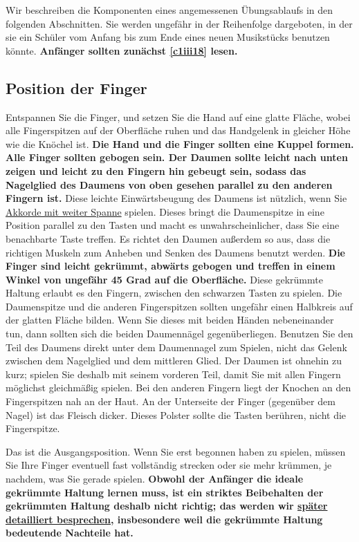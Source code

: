 Wir beschreiben die Komponenten eines angemessenen Übungsablaufs in den folgenden Abschnitten.
Sie werden ungefähr in der Reihenfolge dargeboten, in der sie ein Schüler vom Anfang bis zum Ende eines neuen Musikstücks benutzen könnte.
\textbf{Anfänger sollten zunächst \hyperref[c1iii18]{\autoref{c1iii18}} lesen.}


\subsection{Position der Finger}
\label{c1ii2}

Entspannen Sie die Finger, und setzen Sie die Hand auf eine glatte Fläche, wobei alle Fingerspitzen auf der Oberfläche ruhen und das Handgelenk in gleicher Höhe wie die Knöchel ist.
\textbf{Die Hand und die Finger sollten eine Kuppel formen.
Alle Finger sollten gebogen sein.
Der Daumen sollte leicht nach unten zeigen und leicht zu den Fingern hin gebeugt sein, sodass das Nagelglied des Daumens von oben gesehen parallel zu den anderen Fingern ist.}
Diese leichte Einwärtsbeugung des Daumens ist nützlich, wenn Sie \hyperref[c1iii7e]{Akkorde mit weiter Spanne} spielen.
Dieses bringt die Daumenspitze in eine Position parallel zu den Tasten und macht es unwahrscheinlicher, dass Sie eine benachbarte Taste treffen.
Es richtet den Daumen außerdem so aus, dass die richtigen Muskeln zum Anheben und Senken des Daumens benutzt werden.
\textbf{Die Finger sind leicht gekrümmt, abwärts gebogen und treffen in einem Winkel von ungefähr 45 Grad auf die Oberfläche.}
Diese gekrümmte Haltung erlaubt es den Fingern, zwischen den schwarzen Tasten zu spielen.
Die Daumenspitze und die anderen Fingerspitzen sollten ungefähr einen Halbkreis auf der glatten Fläche bilden.
Wenn Sie dieses mit beiden Händen nebeneinander tun, dann sollten sich die beiden Daumennägel gegenüberliegen.
Benutzen Sie den Teil des Daumens direkt unter dem Daumennagel zum Spielen, nicht das Gelenk zwischen dem Nagelglied und dem mittleren Glied.
Der Daumen ist ohnehin zu kurz; spielen Sie deshalb mit seinem vorderen Teil, damit Sie mit allen Fingern möglichst gleichmäßig spielen.
Bei den anderen Fingern liegt der Knochen an den Fingerspitzen nah an der Haut.
An der Unterseite der Finger (gegenüber dem Nagel) ist das Fleisch dicker.
Dieses Polster sollte die Tasten berühren, nicht die Fingerspitze.

Das ist die Ausgangsposition.
Wenn Sie erst begonnen haben zu spielen, müssen Sie Ihre Finger eventuell fast vollständig strecken oder sie mehr krümmen, je nachdem, was Sie gerade spielen.
\textbf{Obwohl der Anfänger die ideale gekrümmte Haltung lernen muss, ist ein striktes Beibehalten der gekrümmten Haltung deshalb nicht richtig; das werden wir \hyperref[c1iii4b]{später detailliert besprechen}, insbesondere weil die gekrümmte Haltung bedeutende Nachteile hat.}



